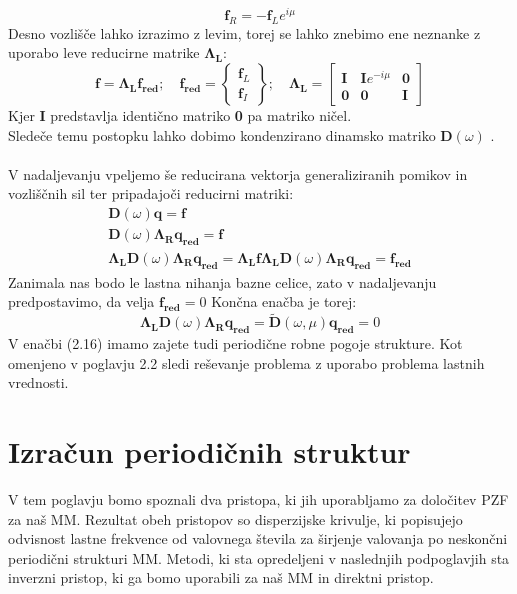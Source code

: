 \documentclass[12pt]{report}
\begin{document}
\begin{equation}
  \mathbf{f}_R = -\mathbf{f}_L e^{i\mu}
\end{equation}
Desno vozlišče lahko izrazimo z levim, torej se lahko znebimo ene neznanke z uporabo leve reducirne matrike $\mathbf{\Lambda_L}$:
\begin{equation}
  \mathbf{f}=\mathbf{\Lambda_L f_{red}}; \quad 
  \mathbf{f_{red}} = \begin{Bmatrix}
    \mathbf{f}_L \\
    \mathbf{f}_I
  \end{Bmatrix}; \quad
  \mathbf{\Lambda_L} = \begin{bmatrix}
    \mathbf{I} & \mathbf{I}e^{-i\mu} & \mathbf{0} \\
    \mathbf{0} & \mathbf{0} & \mathbf{I}
  \end{bmatrix}
\end{equation}
Kjer \textbf{I} predstavlja identično matriko \textbf{0} pa matriko ničel.\\
Sledeče temu postopku lahko dobimo kondenzirano dinamsko matriko $\mathbf{D}(\omega)$ \cite{kosir}. 
\\
\\
V nadaljevanju vpeljemo še reducirana vektorja generaliziranih pomikov in vozliščnih sil ter pripadajoči reducirni matriki:
\begin{equation*}
  \begin{aligned}
    \mathbf{D}(\omega)\mathbf{q}=\mathbf{f} \\
    \mathbf{D}(\omega)\mathbf{\Lambda_R q_{red}} = \mathbf{f} \\
    \mathbf{\Lambda_L} \mathbf{D}(\omega)\mathbf{\Lambda_R q_{red}} = \mathbf{\Lambda_L} \mathbf{f}
    \mathbf{\Lambda_L} \mathbf{D}(\omega)\mathbf{\Lambda_R q_{red}} = \mathbf{f_{red}}
  \end{aligned}
\end{equation*}
Zanimala nas bodo le lastna nihanja bazne celice, zato v nadaljevanju predpostavimo, da velja $\mathbf{f_{red}}=0$
Končna enačba je torej:
\begin{equation}
  \mathbf{\Lambda_L} \mathbf{D}(\omega)\mathbf{\Lambda_R q_{red}} = \mathbf{\widetilde{D}}(\omega, \mu) \mathbf{q_{red}} = 0
\end{equation}
V enačbi (2.16) imamo zajete tudi periodične robne pogoje strukture. Kot omenjeno v poglavju 2.2 sledi reševanje problema z uporabo problema
lastnih vrednosti.

\section{Izračun periodičnih struktur}
V tem poglavju bomo spoznali dva pristopa, ki jih uporabljamo za določitev \ac{PZF} za naš \ac{MM}. Rezultat obeh pristopov so disperzijske krivulje, ki popisujejo odvisnost lastne frekvence od valovnega števila 
za širjenje valovanja po neskončni periodični strukturi \ac{MM}. Metodi, ki sta opredeljeni v naslednjih podpoglavjih sta inverzni pristop, ki ga bomo uporabili za naš \ac{MM} in direktni pristop.
\end{document}
